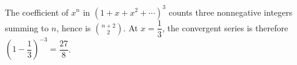 The coefficient of $x^n$ in $(1+x+x^2+\cdots)^3$ counts three nonnegative integers summing to $n$, hence is $\binom{n+2}{2}$. At $x=\dfrac{1}{3}$, the convergent series is therefore $(1-\dfrac{1}{3})^{-3}=\boxed{\dfrac{27}{8}}$.
